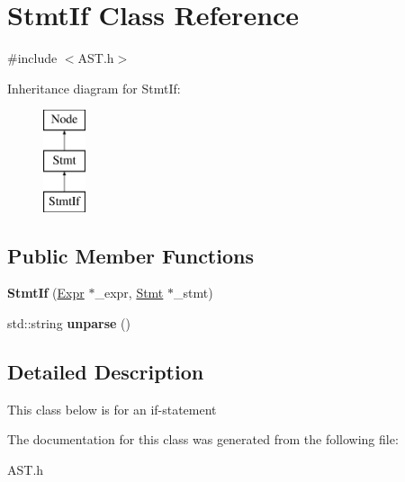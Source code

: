 \hypertarget{classStmtIf}{\section{Stmt\-If Class Reference}
\label{classStmtIf}
}


{\ttfamily \#include $<$A\-S\-T.\-h$>$}

Inheritance diagram for Stmt\-If\-:\begin{figure}[H]
\begin{center}
\leavevmode
\includegraphics[height=3.000000cm]{classStmtIf}
\end{center}
\end{figure}
\subsection*{Public Member Functions}
\begin{DoxyCompactItemize}
\item 
\hypertarget{classStmtIf_a854063cee761f01d67a0f1cec9d8f2d8}{{\bfseries Stmt\-If} (\hyperlink{classExpr}{Expr} $\ast$\-\_\-expr, \hyperlink{classStmt}{Stmt} $\ast$\-\_\-stmt)}\label{classStmtIf_a854063cee761f01d67a0f1cec9d8f2d8}

\item 
\hypertarget{classStmtIf_a6d74da2991d585ee7ccf23e81d4de602}{std\-::string {\bfseries unparse} ()}\label{classStmtIf_a6d74da2991d585ee7ccf23e81d4de602}

\end{DoxyCompactItemize}


\subsection{Detailed Description}
This class below is for an if-\/statement 

The documentation for this class was generated from the following file\-:\begin{DoxyCompactItemize}
\item 
A\-S\-T.\-h\end{DoxyCompactItemize}
